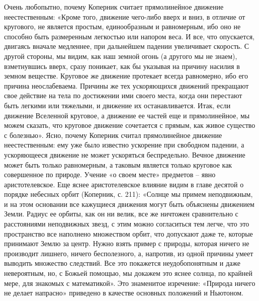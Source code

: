 Очень  любопытно,  почему   Коперник  считает  прямолинейное  движение
неестественным:  «Кроме   того,  движение  чего-либо  вверх   и  вниз,
в  отличие   от  кругового,  не  является   простым,  единообразным  и
равномерным,  ибо  оно  не  способно быть  размеренным  легкостью  или
напором веса. И  все, что опускается, двигаясь  вначале медленнее, при
дальнейшем падении  увеличивает скорость. С другой  стороны, мы видим,
как  наш земной  огонь (а  другого мы  не знаем),  взметнувшись вверх,
сразу поникает, как бы указывая  на причину насилия в земном веществе.
Круговое  же движение  протекает  всегда равномерно,  ибо его  причина
неослабеваема. Причины  же тех  ускоряющихся движений  прекращают свое
действие на тела  по достижении ими своего места,  когда они перестают
быть легкими или  тяжелыми, и движение их  останавливается. Итак, если
движение Вселенной круговое, а движение ее частей еще и прямолинейное,
мы можем сказать, что круговое движение сочетается с прямым, как живое
существо  с  болезнью».  Ясно, почему  Коперник  считал  прямолинейное
движение неестественным: ему уже было известно ускорение при свободном
падении,  а ускоряющееся  движение не  может ускоряться  беспредельно.
Вечное  движение может  быть  только равномерным,  а таковым  является
только круговое  как совершенное  по природе.  Учение «о  своем месте»
предметов --  явно аристотелевское. Еще яснее  аристотелевское влияние
видим в  главе десятой  о порядке небесных  орбит (Коперник,  с. 211):
«Солнце  мы примем  неподвижным,  и на  этом  основании все  кажущиеся
движения могут быть  объяснены движением Земли. Радиус  ее орбиты, как
он ни велик,  все же ничтожен сравнительно  с расстояниями неподвижных
звезд, с  этим можно согласиться  тем легче, что это  пространство все
наполнено множеством  орбит, что допускают даже  те, которые принимают
Землю  за центр.  Нужно  взять  пример с  природы,  которая ничего  не
производит лишнего, ничего бесполезного, а, напротив, из одной причины
умеет выводить множество следствий.  Все это покажется неудобопонятным
и  даже  невероятным, но,  с  Божьей  помощью,  мы докажем  это  яснее
солнца, по крайней  мере, для знакомых с  математикой». Это знаменитое
изречение: «Природа  ничего не  делает напрасно» приведено  в качестве
основных положений и Ньютоном.

